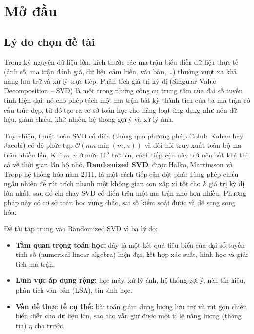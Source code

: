 
\newpage
\section{Mở đầu}

\subsection{Lý do chọn đề tài}

Trong kỷ nguyên dữ liệu lớn, kích thước các ma trận biểu diễn dữ liệu thực tế
(ảnh số, ma trận đánh giá, dữ liệu cảm biến, văn bản, \dots) thường vượt xa khả
năng lưu trữ và xử lý trực tiếp. Phân tích giá trị kỳ dị (Singular Value
Decomposition -- SVD) là một trong những công cụ trung tâm của đại số tuyến tính
hiện đại: nó cho phép tách một ma trận bất kỳ thành tích của ba ma trận có cấu
trúc đẹp, từ đó tạo ra cơ sở toán học cho hàng loạt ứng dụng như nén dữ liệu,
giảm chiều, khử nhiễu, hệ thống gợi ý và xử lý ảnh.

Tuy nhiên, thuật toán SVD cổ điển (thông qua phương pháp Golub--Kahan hay
Jacobi) có độ phức tạp $\mathcal{O}(mn\min(m,n))$ và đòi hỏi truy xuất toàn bộ
ma trận nhiều lần. Khi $m, n$ ở mức $10^5$ trở lên, cách tiếp cận này trở nên
bất khả thi cả về thời gian lẫn bộ nhớ. \textbf{Randomized SVD}, được Halko,
Martinsson và Tropp hệ thống hóa năm 2011, là một cách tiếp cận đột phá: dùng
phép chiếu ngẫu nhiên để rút trích nhanh một không gian con xấp xỉ tốt cho
$k$ giá trị kỳ dị lớn nhất, sau đó chỉ chạy SVD cổ điển trên một ma trận nhỏ
hơn nhiều. Phương pháp này có cơ sở toán học vững chắc, sai số kiểm soát được
và dễ song song hóa.

Đề tài tập trung vào Randomized SVD vì ba lý do:
\begin{itemize}
    \item \textbf{Tầm quan trọng toán học:} đây là một kết quả tiêu biểu của
    đại số tuyến tính số (numerical linear algebra) hiện đại, kết hợp xác suất,
    hình học và giải tích ma trận.
    \item \textbf{Lĩnh vực áp dụng rộng:} học máy, xử lý ảnh, hệ thống gợi ý,
    nén tín hiệu, phân tích văn bản (LSA), tin sinh học.
    \item \textbf{Vấn đề thực tế cụ thể:} bài toán giảm dung lượng lưu trữ và
    rút gọn chiều biểu diễn cho dữ liệu lớn, sao cho vẫn giữ được một tỉ lệ
    năng lượng (thông tin) $\eta$ cho trước.
\end{itemize}

